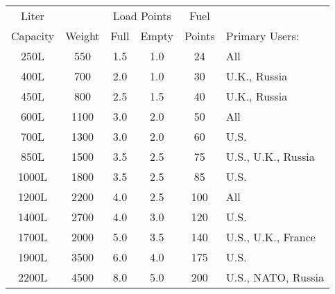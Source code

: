 \begin{twocolumntable}
\begin{tabular}{cccccl}
\toprule
Liter&&\multicolumn{2}{c}{Load Points}&Fuel\\
Capacity&Weight&Full&Empty&Points&Primary Users:\\
\midrule
\phantom{0}250L&\phantom{0}550&1.5&1.0&\phantom{0}24&All\\
\phantom{0}400L&\phantom{0}700&2.0&1.0&\phantom{0}30&U.K., Russia\\
\phantom{0}450L&\phantom{0}800&2.5&1.5&\phantom{0}40&U.K., Russia\\
\phantom{0}600L&\phantom{}1100&3.0&2.0&\phantom{0}50&All\\
\phantom{0}700L&\phantom{}1300&3.0&2.0&\phantom{0}60&U.S.\\
\phantom{0}850L&\phantom{}1500&3.5&2.5&\phantom{0}75&U.S., U.K., Russia\\
\phantom{}1000L&\phantom{}1800&3.5&2.5&\phantom{0}85&U.S.\\
\phantom{}1200L&\phantom{}2200&4.0&2.5&\phantom{}100&All\\
\phantom{}1400L&\phantom{}2700&4.0&3.0&\phantom{}120&U.S.\\
\phantom{}1700L&\phantom{}2000&5.0&3.5&\phantom{}140&U.S., U.K., France\\
\phantom{}1900L&\phantom{}3500&6.0&4.0&\phantom{}175&U.S.\\
\phantom{}2200L&\phantom{}4500&8.0&5.0&\phantom{}200&U.S., NATO, Russia\\
\bottomrule
\end{tabular}
\end{twocolumntable}